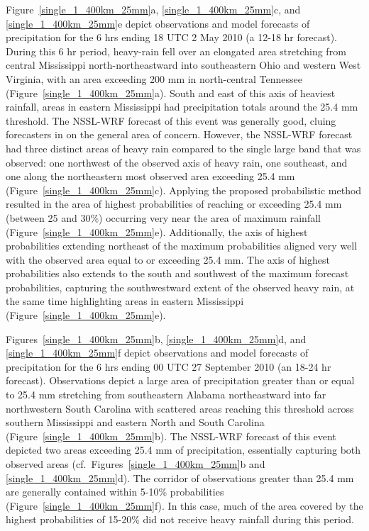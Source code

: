 \mbox{Figure \ref{single_1_400km_25mm}a}, \mbox{\ref{single_1_400km_25mm}c}, and \mbox{\ref{single_1_400km_25mm}e} depict observations and model forecasts of precipitation for the 6 hrs ending 18 UTC 2 May 2010 (a 12-18 hr forecast).
During this 6 hr period, heavy-rain fell over an elongated area stretching from central Mississippi north-northeastward into southeastern Ohio and western West Virginia, with an area exceeding 200 mm in north-central Tennessee \mbox{(Figure \ref{single_1_400km_25mm}a)}.
South and east of this axis of heaviest rainfall, areas in eastern Mississippi had precipitation totals around the 25.4 mm threshold.
The NSSL-WRF forecast of this event was generally good, cluing forecasters in on the general area of concern.
However, the NSSL-WRF forecast had three distinct areas of heavy rain compared to the single large band that was observed: one northwest of the observed axis of heavy rain, one southeast, and one along the northeastern most observed area exceeding 25.4 mm \mbox{(Figure \ref{single_1_400km_25mm}c)}.
Applying the proposed probabilistic method resulted in the area of highest probabilities of reaching or exceeding 25.4 mm (between 25 and 30\%) occurring very near the area of maximum rainfall \mbox{(Figure \ref{single_1_400km_25mm}e)}.
Additionally, the axis of highest probabilities extending northeast of the maximum probabilities aligned very well with the observed area equal to or exceeding 25.4 mm.
The axis of highest probabilities also extends to the south and southwest of the maximum forecast probabilities, capturing the southwestward extent of the observed heavy rain, at the same time highlighting areas in eastern Mississippi \mbox{(Figure \ref{single_1_400km_25mm}e)}.


\mbox{Figures \ref{single_1_400km_25mm}b}, \mbox{\ref{single_1_400km_25mm}d}, and \mbox{\ref{single_1_400km_25mm}f} depict observations and model forecasts of precipitation for the 6 hrs ending 00 UTC 27 September 2010 (an 18-24 hr forecast).
Observations depict a large area of precipitation greater than or equal to 25.4 mm stretching from southeastern Alabama northeastward into far northwestern South Carolina with scattered areas reaching this threshold across southern Mississippi and eastern North and South Carolina \mbox{(Figure \ref{single_1_400km_25mm}b)}.
The NSSL-WRF forecast of this event depicted two areas exceeding 25.4 mm of precipitation, essentially capturing both observed areas (\mbox{cf. Figures \ref{single_1_400km_25mm}b} and \mbox{\ref{single_1_400km_25mm}d)}.
The corridor of observations greater than 25.4 mm are generally contained within 5-10\% probabilities \mbox{(Figure \ref{single_1_400km_25mm}f)}. In this case, much of the area covered by the highest probabilities of 15-20\% did not receive heavy rainfall during this period.



